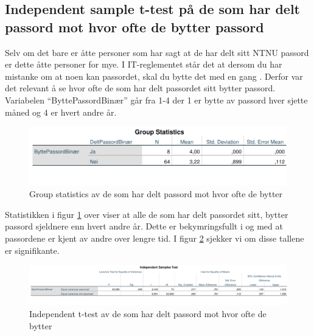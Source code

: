 \subsection{Independent sample t-test på de som har delt passord mot hvor ofte de bytter passord}
Selv om det bare er åtte personer som har sagt at de har delt sitt NTNU passord er dette åtte personer for mye. I IT-reglementet står det at dersom du har mistanke om at noen kan passordet, skal du bytte det med en gang \cite{ITReg}. Derfor var det relevant å se hvor ofte de som har delt passordet sitt bytter passord. Variabelen ``ByttePassordBinær'' går fra 1-4 der 1 er bytte av passord hver sjette måned og 4 er hvert andre år. 

\begin{figure}[H]
    \centering
    \includegraphics[scale=0.7]{case_2/bilder/spss/anova_ttest/deltpassord_byttepassord_groupstats.pdf}
    \caption[Group statistics av de som har delt passord mot hvor ofte de bytter]{Group statistics av de som har delt passord mot hvor ofte de bytter}
    \label{fig:deltpassord-byttepassord-groupstats}
\end{figure}

Statistikken i figur \ref{fig:deltpassord-byttepassord-groupstats} over viser at alle de som har delt passordet sitt, bytter passord sjeldnere enn hvert andre år. Dette er bekymringsfullt i og med at passordene er kjent av andre over lengre tid. I figur \ref{fig:deltpassord-byttepassord-ttest} sjekker vi om disse tallene er signifikante.

\begin{figure}[H]
    \centering
    \includegraphics[scale=0.4]{case_2/bilder/spss/anova_ttest/deltpassord_byttepassord_ttest.pdf}
    \caption[Independent t-test av de som har delt passord mot hvor ofte de bytter]{Independent t-test av de som har delt passord mot hvor ofte de bytter}
    \label{fig:deltpassord-byttepassord-ttest}
\end{figure}

